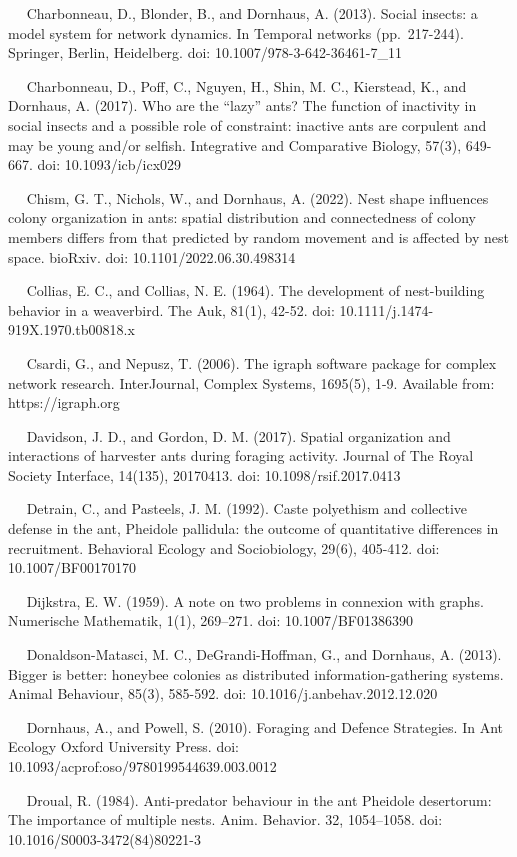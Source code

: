 \documentclass[3p]{elsarticle} %
\begin{document}
~~ Charbonneau, D., Blonder, B., and Dornhaus, A. (2013). Social
insects: a model system for network dynamics. In Temporal networks
(pp.~217-244). Springer, Berlin, Heidelberg. doi:
10.1007/978-3-642-36461-7\_11

~~ Charbonneau, D., Poff, C., Nguyen, H., Shin, M. C., Kierstead, K.,
and Dornhaus, A. (2017). Who are the ``lazy'' ants? The function of
inactivity in social insects and a possible role of constraint: inactive
ants are corpulent and may be young and/or selfish. Integrative and
Comparative Biology, 57(3), 649-667. doi: 10.1093/icb/icx029

~~ Chism, G. T., Nichols, W., and Dornhaus, A. (2022). Nest shape
influences colony organization in ants: spatial distribution and
connectedness of colony members differs from that predicted by random
movement and is affected by nest space. bioRxiv. doi:
10.1101/2022.06.30.498314

~~ Collias, E. C., and Collias, N. E. (1964). The development of
nest-building behavior in a weaverbird. The Auk, 81(1), 42-52. doi:
10.1111/j.1474-919X.1970.tb00818.x

~~ Csardi, G., and Nepusz, T. (2006). The igraph software package for
complex network research. InterJournal, Complex Systems, 1695(5), 1-9.
Available from: https://igraph.org

~~ Davidson, J. D., and Gordon, D. M. (2017). Spatial organization and
interactions of harvester ants during foraging activity. Journal of The
Royal Society Interface, 14(135), 20170413. doi: 10.1098/rsif.2017.0413

~~ Detrain, C., and Pasteels, J. M. (1992). Caste polyethism and
collective defense in the ant, Pheidole pallidula: the outcome of
quantitative differences in recruitment. Behavioral Ecology and
Sociobiology, 29(6), 405-412. doi: 10.1007/BF00170170

~~ Dijkstra, E. W. (1959). A note on two problems in connexion with
graphs. Numerische Mathematik, 1(1), 269--271. doi: 10.1007/BF01386390

~~ Donaldson-Matasci, M. C., DeGrandi-Hoffman, G., and Dornhaus, A.
(2013). Bigger is better: honeybee colonies as distributed
information-gathering systems. Animal Behaviour, 85(3), 585-592. doi:
10.1016/j.anbehav.2012.12.020

~~ Dornhaus, A., and Powell, S. (2010). Foraging and Defence Strategies.
In Ant Ecology Oxford University Press. doi:
10.1093/acprof:oso/9780199544639.003.0012

~~ Droual, R. (1984). Anti-predator behaviour in the ant Pheidole
desertorum: The importance of multiple nests. Anim. Behavior. 32,
1054--1058. doi: 10.1016/S0003-3472(84)80221-3
\end{document}
